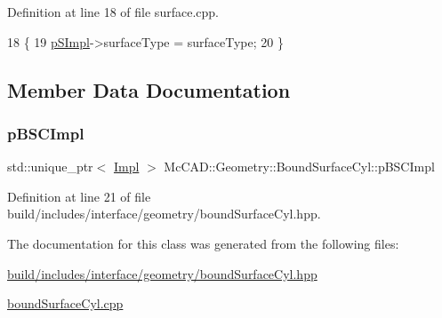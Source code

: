 Definition at line 18 of file surface.\+cpp.


\begin{DoxyCode}
18                                                                 \{
19   \hyperlink{classMcCAD_1_1Geometry_1_1Surface_a0097d4e9bfc1c7cd7cd33d81492b9100}{pSImpl}->surfaceType = surfaceType;
20 \}
\end{DoxyCode}


\subsection{Member Data Documentation}
\mbox{\label{classMcCAD_1_1Geometry_1_1BoundSurfaceCyl_a01b2ad0ca6e49c27d8fd65e43e7a3cb9}} 
\subsubsection{\texorpdfstring{p\+B\+S\+C\+Impl}{pBSCImpl}}
{\footnotesize\ttfamily std\+::unique\+\_\+ptr$<$ \hyperlink{classMcCAD_1_1Geometry_1_1BoundSurfaceCyl_1_1Impl}{Impl} $>$ Mc\+C\+A\+D\+::\+Geometry\+::\+Bound\+Surface\+Cyl\+::p\+B\+S\+C\+Impl\hspace{0.3cm}{\ttfamily [private]}}



Definition at line 21 of file build/includes/interface/geometry/bound\+Surface\+Cyl.\+hpp.



The documentation for this class was generated from the following files\+:\begin{DoxyCompactItemize}
\item 
\hyperlink{build_2includes_2interface_2geometry_2boundSurfaceCyl_8hpp}{build/includes/interface/geometry/bound\+Surface\+Cyl.\+hpp}\item 
\hyperlink{boundSurfaceCyl_8cpp}{bound\+Surface\+Cyl.\+cpp}\end{DoxyCompactItemize}
